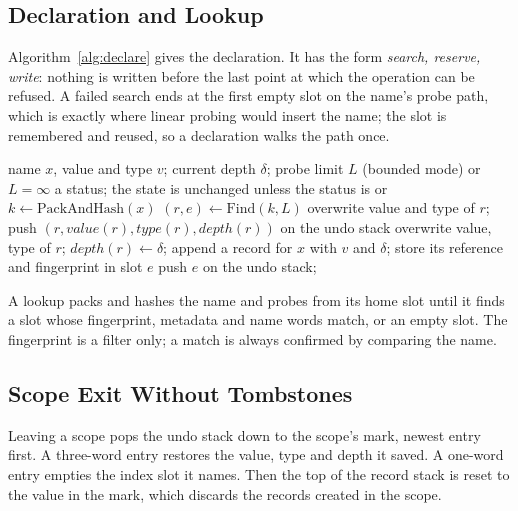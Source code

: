 \subsection{Declaration and Lookup}
Algorithm~\ref{alg:declare} gives the declaration. It has the form \emph{search, reserve, write}: nothing is written before the last point at which the operation can be refused. A failed search ends at the first empty slot on the name's probe path, which is exactly where linear probing would insert the name; the slot is remembered and reused, so a declaration walks the path once.

\begin{algorithm}[t!]
\caption{Declaration of name $x$ with value $v$}
\label{alg:declare}
\begin{algorithmic}[1]
\REQUIRE name $x$, value and type $v$; current depth $\delta$; probe limit $L$ (bounded mode) or $L=\infty$
\ENSURE a status; the state is unchanged unless the status is  or 
\STATE $k \leftarrow \mathrm{PackAndHash}(x)$ \hfill{}
\STATE $(r, e) \leftarrow \mathrm{Find}(k, L)$ \hfill{}
  \STATE overwrite value and type of $r$; \RETURN {}
   \RETURN {} \ENDIF
  \STATE push $(r, \mathit{value}(r), \mathit{type}(r), \mathit{depth}(r))$ on the undo stack
  \STATE overwrite value, type of $r$; $\mathit{depth}(r) \leftarrow \delta$; \RETURN {}
\ENDIF
{}
  \RETURN {}
\ENDIF
{} \RETURN {} \ENDIF
\STATE append a record for $x$ with $v$ and $\delta$; store its reference and fingerprint in slot $e$
\STATE push $e$ on the undo stack; \RETURN {}
\end{algorithmic}
\end{algorithm}

A lookup packs and hashes the name and probes from its home slot until it finds a slot whose fingerprint, metadata and name words match, or an empty slot. The fingerprint is a filter only; a match is always confirmed by comparing the name.

\subsection{Scope Exit Without Tombstones}
\label{sec:exit}
Leaving a scope pops the undo stack down to the scope's mark, newest entry first. A three-word entry restores the value, type and depth it saved. A one-word entry empties the index slot it names. Then the top of the record stack is reset to the value in the mark, which discards the records created in the scope.

